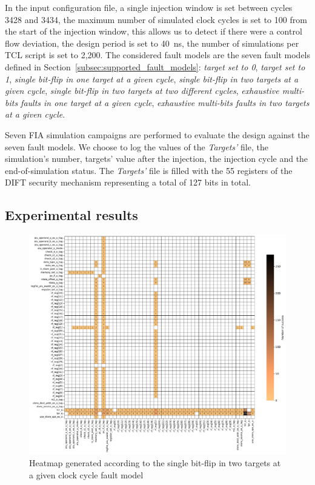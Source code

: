 In the input configuration file, a single injection window is set between cycles 3428 and 3434, the maximum number of simulated clock cycles is set to 100 from the start of the injection window, this allows us to detect if there were a control flow deviation, the design period is set to 40~ns, the number of simulations per TCL script is set to 2,200. The considered fault models are the seven fault models defined in Section~\ref{subsec:supported_fault_models}: \textit{target set to 0}, \textit{target set to 1}, \textit{single bit-flip in one target at a given cycle}, \textit{single bit-flip in two targets at a given cycle}, \textit{single bit-flip in two targets at two different cycles}, \textit{exhaustive multi-bits faults in one target at a given cycle}, \textit{exhaustive multi-bits faults in two targets at a given cycle}.

Seven FIA simulation campaigns are performed to evaluate the design against the seven fault models.
We choose to log the values of the \textit{Targets'} file, the simulation's number, targets' value after the injection, the injection cycle and the end-of-simulation status.
The \textit{Targets'} file is filled with the 55 registers of the DIFT security mechanism representing a total of 127 bits in total.

\subsection{Experimental results} 
\label{subsec:results}

\begin{figure}[t]
    \centering
    \includegraphics[width=\textwidth]{c4_fissa/img/heatmap/heatmap_buffer_overflow_wop_1_single_bitflip_spatial_2.pdf}
    \caption{Heatmap generated according to the single bit-flip in two targets at a given clock cycle fault model}
    \label{fig:heatmap_spatial}
\end{figure}

